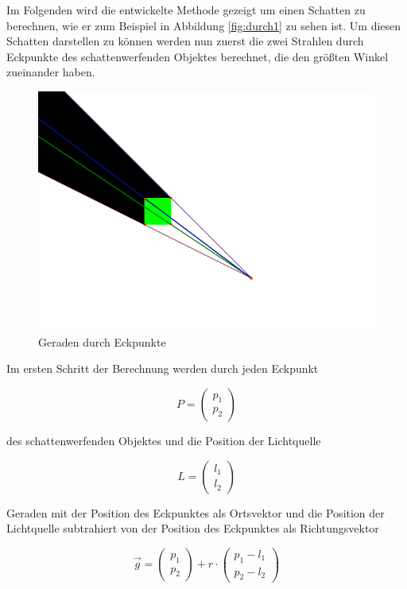 Im Folgenden wird die entwickelte Methode gezeigt um einen Schatten zu berechnen, wie er zum
Beispiel in Abbildung \ref{fig:durch1} zu sehen ist. Um diesen Schatten darstellen zu können
werden nun zuerst die zwei Strahlen durch Eckpunkte des schattenwerfenden Objektes berechnet,
die den größten Winkel zueinander haben.

\begin{figure}[t]
	\centering
	\includegraphics[width=\columnwidth]{images/durchfuehrung_1.png}
	\caption{Geraden durch Eckpunkte}
	\label{fig:durch2}
\end{figure}

Im ersten Schritt der Berechnung werden durch jeden Eckpunkt

\begin{equation}
	P = \begin{pmatrix} p_1 \\ p_2 \end{pmatrix}
\end{equation}

des schattenwerfenden Objektes und die Position der Lichtquelle

\begin{equation}
	L = \begin{pmatrix}  l_1 \\ l_2 \end{pmatrix}
\end{equation}

Geraden mit der Position des Eckpunktes als Ortsvektor und die Position der Lichtquelle subtrahiert von der Position des Eckpunktes als Richtungsvektor

\begin{equation}
	\vec{g} = \begin{pmatrix} p_1 \\ p_2 \end{pmatrix} + r \cdot \begin{pmatrix} p_1 - l_1 \\ p_2 - l_2 \end{pmatrix}
\end{equation}

